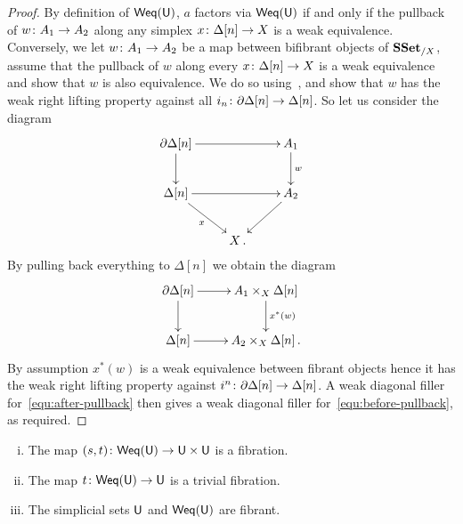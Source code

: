 \documentclass[reqno,10pt,a4paper,oneside,draft]{amsart}
\begin{document}
\begin{proof} By definition of $\mathsf{Weq}(\mathsf{U})$, $a$ factors via $\mathsf{Weq}(\mathsf{U})$ if and only if the pullback of $w \colon A_1 \to A_2$ along any simplex $x \colon \Delta[n] \rightarrow X$  is a weak equivalence.  Conversely,
we let $w \colon A_1 \rightarrow A_2$ be a map between bifibrant objects of $\mathbf{SSet}_{/X}$, assume that the pullback of $w$ along every $x \colon \Delta[n] \rightarrow X$ is a weak equivalence and show that $w$ is also equivalence.  We do so using~\cite[\S 2.5.7]{henry2018wms}, and show that $w$ has the weak right lifting property against all $i_n \colon \partial \Delta[n] \rightarrow \Delta[n]$. So let us consider the diagram
\begin{equation}
\label{equ:before-pullback}
\begin{gathered}
\xymatrix{\partial \Delta[n] \ar[rr] \ar[d] & & A_1 \ar[d]^w \\
\Delta[n] \ar[rr] \ar[dr]_{x}
 & & A_2 \ar[dl] \\
& X \, .&}  
\end{gathered}
\end{equation}
By pulling back everything to $\Delta[n]$ we obtain the diagram
\begin{equation}
\label{equ:after-pullback}
\begin{gathered}
\xymatrix{
\partial \Delta[n] \ar[r] \ar[d] & A_1 \times_X \Delta[n] \ar[d]^{x^*(w)} \\
\Delta[n] \ar[r] & A_2 \times_X \Delta[n]  \, .
} 
\end{gathered}
\end{equation}
By assumption $x^*(w)$ is a weak equivalence between fibrant objects hence it has the weak right lifting property against $i^n \colon \partial \Delta[n] \rightarrow \Delta[n]$. A weak diagonal filler for~\eqref{equ:after-pullback} then gives  a weak diagonal filler for~\eqref{equ:before-pullback}, as required.
\end{proof}



\begin{proposition} \label{thm:fibrancy-of-u} \hfill 
\begin{enumerate}[(i)]
\item The map $(s, t) \colon \mathsf{Weq}(\mathsf{U}) \rightarrow \mathsf{U} \times \mathsf{U}$ is a fibration.
\item The map $t \colon \mathsf{Weq}(\mathsf{U}) \rightarrow \mathsf{U}$ is a trivial fibration.
\item The simplicial sets $\mathsf{U}$ and $\mathsf{Weq}(\mathsf{U})$ are fibrant.
\end{enumerate}
\end{proposition}
\end{document}
